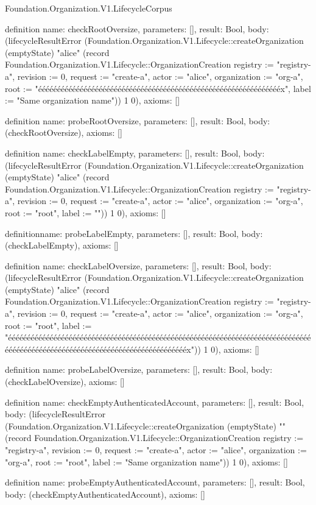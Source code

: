 \begin{lexlean}{Foundation.Organization.V1.LifecycleCorpus}
\begin{semanticmodule}
definition{
  name: checkRootOversize,
  parameters: [],
  result: Bool,
  body: (lifecycleResultError (Foundation.Organization.V1.Lifecycle::createOrganization (emptyState) "alice" (record Foundation.Organization.V1.Lifecycle::OrganizationCreation {registry := "registry-a", revision := 0, request := "create-a", actor := "alice", organization := "org-a", root := "ééééééééééééééééééééééééééééééééééééééééééééééééééééééééééééééééx", label := "Same organization name"})) 1 0),
  axioms: []
}

definition{
  name: probeRootOversize,
  parameters: [],
  result: Bool,
  body: (checkRootOversize),
  axioms: []
}

definition{
  name: checkLabelEmpty,
  parameters: [],
  result: Bool,
  body: (lifecycleResultError (Foundation.Organization.V1.Lifecycle::createOrganization (emptyState) "alice" (record Foundation.Organization.V1.Lifecycle::OrganizationCreation {registry := "registry-a", revision := 0, request := "create-a", actor := "alice", organization := "org-a", root := "root", label := ""})) 1 0),
  axioms: []
}

definition{name: probeLabelEmpty, parameters: [], result: Bool, body: (checkLabelEmpty), axioms: []}

definition{
  name: checkLabelOversize,
  parameters: [],
  result: Bool,
  body: (lifecycleResultError (Foundation.Organization.V1.Lifecycle::createOrganization (emptyState) "alice" (record Foundation.Organization.V1.Lifecycle::OrganizationCreation {registry := "registry-a", revision := 0, request := "create-a", actor := "alice", organization := "org-a", root := "root", label := "ééééééééééééééééééééééééééééééééééééééééééééééééééééééééééééééééééééééééééééééééééééééééééééééééééééééééééééééééééééééééééééééééx"})) 1 0),
  axioms: []
}

definition{
  name: probeLabelOversize,
  parameters: [],
  result: Bool,
  body: (checkLabelOversize),
  axioms: []
}

definition{
  name: checkEmptyAuthenticatedAccount,
  parameters: [],
  result: Bool,
  body: (lifecycleResultError (Foundation.Organization.V1.Lifecycle::createOrganization (emptyState) "" (record Foundation.Organization.V1.Lifecycle::OrganizationCreation {registry := "registry-a", revision := 0, request := "create-a", actor := "alice", organization := "org-a", root := "root", label := "Same organization name"})) 1 0),
  axioms: []
}

definition{
  name: probeEmptyAuthenticatedAccount,
  parameters: [],
  result: Bool,
  body: (checkEmptyAuthenticatedAccount),
  axioms: []
}


\end{semanticmodule}
\end{lexlean}
